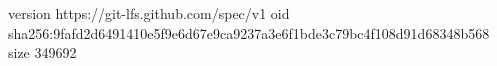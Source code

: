 version https://git-lfs.github.com/spec/v1
oid sha256:9fafd2d6491410e5f9e6d67e9ca9237a3e6f1bde3c79bc4f108d91d68348b568
size 349692
